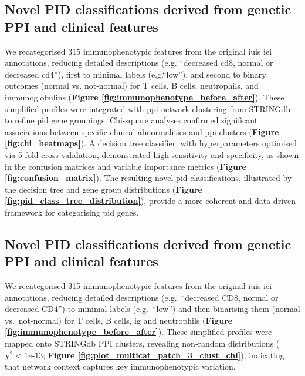 \subsection{Novel PID classifications derived from genetic PPI and clinical features}
We recategorised 315 immunophenotypic features from the original \ac{iuis} \ac{iei} annotations, reducing detailed descriptions (e.g. ``decreased cd8, normal or decreased cd4''), first to 
minimal labels (e.g.``low''), and second to binary outcomes (normal vs. not-normal) for T cells, B cells, neutrophils, and immunoglobulins (\textbf{Figure \ref{fig:immunophenotype_before_after}}). 
These simplified profiles were integrated with \ac{ppi} network clustering from STRINGdb to refine \ac{pid} gene groupings. 
Chi-square analyses confirmed significant associations between specific clinical abnormalities and \ac{ppi} clusters (\textbf{Figure \ref{fig:chi_heatmaps}}). 
A decision tree classifier, with hyperparameters optimised via 5-fold cross validation, demonstrated high sensitivity and specificity, as shown in the confusion matrices and variable importance metrics (\textbf{Figure \ref{fig:confusion_matrix}}). 
The resulting novel \ac{pid} classifications, illustrated by the decision tree and gene group distributions (\textbf{Figure \ref{fig:pid_class_tree_distribution}}), provide a more coherent and data-driven framework for categorising \ac{pid} genes.


\subsection{Novel PID classifications derived from genetic PPI and clinical features}
We recategorised 315 immunophenotypic features from the original \ac{iuis} \ac{iei} annotations, reducing detailed descriptions (e.g.\ “decreased CD8, normal or decreased CD4”) to minimal labels (e.g.\ “low”) and then binarising them (normal vs.\ not-normal) for T cells, B cells, \ac{ig} and neutrophils 
(\textbf{Figure \ref{fig:immunophenotype_before_after}}). 
These simplified profiles were mapped onto STRINGdb PPI clusters, revealing non‑random distributions ($\chi^2 < 1e‑13$; 
\textbf{Figure \ref{fig:plot_multicat_patch_3_clust_chi}}), indicating that network context captures key immunophenotypic variation.

